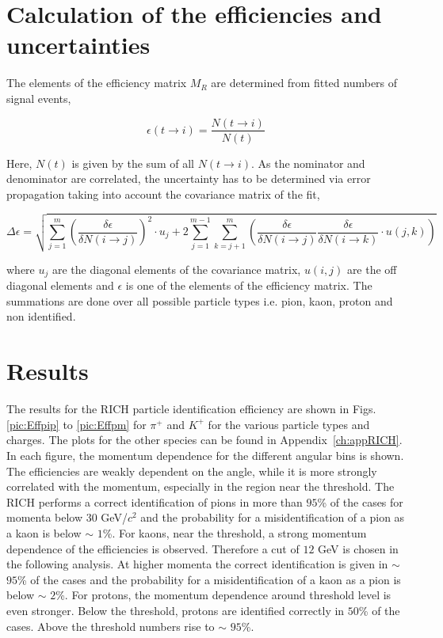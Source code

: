 \section{Calculation of the efficiencies and uncertainties}

The elements of the efficiency matrix $M_R$ are determined from fitted numbers of signal events,

\begin{equation}
  \epsilon(t\rightarrow i) = \frac{N(t\rightarrow i)}{N(t)}
\end{equation}

Here, $N(t)$ is given by the sum of all $N(t \rightarrow i)$. As the nominator and denominator are correlated, the uncertainty has to be determined via error propagation taking into account the covariance matrix of the fit,

\begin{equation}
  \Delta \epsilon = \sqrt{\sum_{j=1}^m \left( \frac{\delta \epsilon}{\delta N(i\rightarrow j)} \right)^2 \cdot u_j + 2 \sum_{j=1}^{m-1} \sum_{k=j+1}^{m} \left( \frac{\delta \epsilon}{\delta N(i\rightarrow j)} \frac{\delta \epsilon}{\delta N(i\rightarrow k)} \cdot u(j,k) \right)}
\end{equation}

where $u_j$ are the diagonal elements of the covariance matrix, $u(i,j)$ are the off diagonal elements and $\epsilon$ is one of the elements of the efficiency matrix. The summations are done over all possible particle types i.e. pion, kaon, proton and non identified.

\section{Results} \label{sec:Results}

The results for the RICH particle identification efficiency are shown in Figs. \ref{pic:Effpip} to \ref{pic:Effpm} for $\pi^+$ and $K^+$ for the various particle types and charges. The plots for the other species can be found in Appendix~\ref{ch:appRICH}. In each figure, the momentum dependence for the different angular bins is shown. The efficiencies are weakly dependent on the angle, while it is more strongly correlated with the momentum, especially in the region near the threshold.
The RICH performs a correct identification of pions in more than $95$\% of the cases for momenta below 30 GeV/$c^2$ and the probability for a misidentification of a pion as a kaon is below $\sim$ $1$\%. For kaons, near the threshold, a strong momentum dependence of the efficiencies is observed. Therefore a cut of $12$ GeV is chosen in the following analysis. At higher momenta the correct identification is given in $\sim$ $95$\% of the cases and the probability for a misidentification of a kaon as a pion is below $\sim$ $2$\%. For protons, the momentum dependence around threshold level is even stronger. Below the threshold, protons are identified correctly in $50$\% of the cases. Above the threshold numbers rise to $\sim$ $95$\%.

